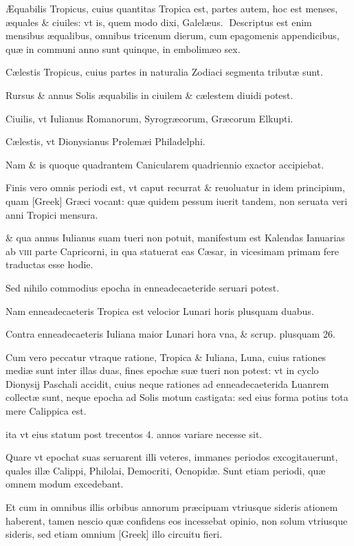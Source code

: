 \begin{parnumbers}

Æquabilis Tropicus, cuius quantitas Tropica est, partes autem, hoc est menses, æquales \& ciuiles: vt is,  quem modo dixi, Galelæus.
Descriptus est enim mensibus æqualibus, omnibus tricenum dierum, cum epagomenis appendicibus, quæ in communi anno sunt quinque, in embolimæo sex.

Cælestis Tropicus, cuius partes in naturalia Zodiaci segmenta tributæ sunt.

Rursus \& annus Solis æquabilis in ciuilem \& cælestem diuidi potest.

Ciuilis, vt Iulianus Romanorum, Syrogræcorum, Græcorum Elkupti.

Cælestis, vt Dionysianus Prolemæi Philadelphi.

Nam \& is quoque quadrantem Canicularem quadriennio exactor accipiebat.

Finis vero omnis periodi est, vt caput recurrat \& reuoluatur in idem principium, quam \textgreek{[Greek]} Græci vocant: quæ quidem pessum iuerit tandem, non seruata veri anni Tropici mensura.

\& qua annus Iulianus  suam tueri non potuit, manifestum est Kalendas Ianuarias ab \textsc{viii} parte Capricorni, in qua statuerat eas Cæsar, in vicesimam primam fere traductas esse hodie.

Sed nihilo commodius epocha in enneadecaeteride seruari potest.

Nam enneadecaeteris Tropica est velocior Lunari horis plusquam duabus.

Contra enneadecaeteris Iuliana maior Lunari hora vna, \& scrup. plusquam 26.

Cum vero peccatur vtraque ratione, Tropica \& Iuliana, Luna, cuius rationes mediæ sunt inter illas duas, fines epochæ suæ tueri non potest: vt in cyclo Dionysij Paschali accidit, cuius neque rationes ad enneadecaeterida Luanrem collectæ sunt, neque epocha ad Solis motum castigata: sed eius forma potius tota mere Calippica est.

ita vt eius statum post trecentos  4. annos variare necesse sit.

Quare vt epochat suas seruarent illi veteres, immanes periodos excogitauerunt, quales illæ Calippi, Philolai, Democriti, Ocnopidæ. Sunt etiam periodi, quæ omnem modum excedebant.

Et cum in omnibus illis orbibus annorum præcipuam vtriusque sideris ationem haberent, tamen nescio quæ confidens eos incessebat opinio, non solum vtriusque sideris, sed etiam omnium \textgreek{[Greek]} illo circuitu fieri.


\end{parnumbers}
